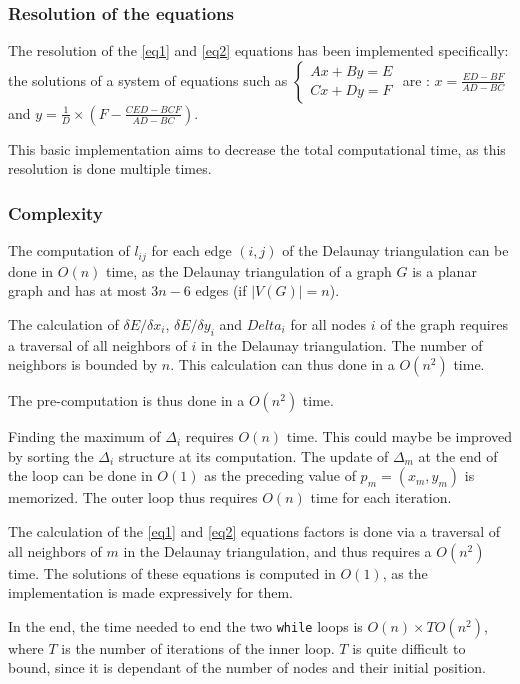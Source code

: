 \documentclass[12pt]{report}
\begin{document}
\subsubsection{Resolution of the equations}

The resolution of the \ref{eq1} and \ref{eq2} equations has been implemented specifically: the solutions of a system of equations such as 
$\begin{cases}
Ax + By = E \\
C x + Dy = F
\end{cases}$
are : $x = \frac{ED - BF}{AD - BC}$ and $y = \frac{1}{D} \times(F - \frac{CED - BCF}{AD- BC})$.

This basic implementation aims to decrease the total computational time, as this resolution is done multiple times.

\subsubsection{Complexity}

The computation of $l_{ij}$ for each edge $(i,j)$ of the Delaunay triangulation can be done in $O(n)$ time, as the Delaunay triangulation of a graph $G$ is a planar graph and has at most $3n -6$ edges (if $|V(G)| = n$).

The calculation of  $\delta E / \delta x_i$, $\delta E / \delta y_i$ and $Delta_i$ for all nodes $i$ of the graph requires a traversal of all neighbors of $i$ in the Delaunay triangulation. The number of neighbors is bounded by $n$. This calculation can thus done in a $O(n^2)$ time.

The pre-computation is thus done in a $O(n^2)$ time.

Finding the maximum of $\Delta_i$ requires $O(n)$ time. This could maybe be improved by sorting the $\Delta_i$ structure at its computation. The update of $\Delta_m$ at the end of the loop can be done in $O(1)$ as the preceding value of $p_m = (x_m, y_m)$ is memorized. The outer loop thus requires $O(n)$ time for each iteration.

The calculation of the \ref{eq1} and \ref{eq2} equations factors is done via a traversal of all neighbors of $m$ in the Delaunay triangulation, and thus requires a $O(n^2)$ time.
The solutions of these equations is computed in $O(1)$, as the implementation is made expressively for them.

In the end, the time needed to end the two \texttt{while} loops is $O(n) \times T O(n^2)$, where $T$ is the number of iterations of the inner loop. $T$ is quite difficult to bound, since it is dependant of the number of nodes and their initial position.
\end{document}
